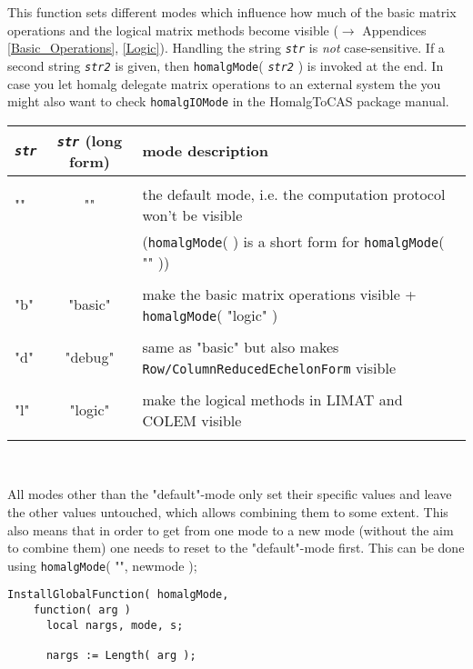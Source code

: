 \documentclass[a4paper,11pt]{report}
\begin{document}
{{{ This function sets different modes which influence how much of the basic
matrix operations and the logical matrix methods become visible ($\to$ Appendices \ref{Basic_Operations}, \ref{Logic}). Handling the string \mbox{\texttt{\mdseries\slshape str}} is \emph{not} case-sensitive. If a second string \mbox{\texttt{\mdseries\slshape str2}} is given, then \texttt{homalgMode}( \mbox{\texttt{\mdseries\slshape str2}} ) is invoked at the end. In case you let \textsf{homalg} delegate matrix operations to an external system the you might also want to
check \texttt{homalgIOMode} in the \textsf{HomalgToCAS} package manual. \begin{center}
\begin{tabular}{l|c|l}\mbox{\texttt{\mdseries\slshape str}}&
\mbox{\texttt{\mdseries\slshape str}} (long form)&
mode description\\
\hline
&
&
\\
""&
""&
the default mode, i.e. the computation protocol won't be visible\\
&
&
(\texttt{homalgMode}( ) is a short form for \texttt{homalgMode}( "" ))\\
&
&
\\
"b"&
"basic"&
make the basic matrix operations visible + \texttt{homalgMode}( "logic" )\\
&
&
\\
"d"&
"debug"&
same as "basic" but also makes \texttt{Row/ColumnReducedEchelonForm} visible\\
&
&
\\
"l"&
"logic"&
make the logical methods in \textsf{LIMAT} and \textsf{COLEM} visible\\
&
&
\\
\hline
\end{tabular}\\[2mm]
\end{center}

 All modes other than the "default"-mode only set their specific values and
leave the other values untouched, which allows combining them to some extent.
This also means that in order to get from one mode to a new mode (without the
aim to combine them) one needs to reset to the "default"-mode first. This can
be done using \texttt{homalgMode}( "", new{\textunderscore}mode ); 
\begin{Verbatim}[fontsize=\small,frame=single,label=Code]
  InstallGlobalFunction( homalgMode,
    function( arg )
      local nargs, mode, s;
      
      nargs := Length( arg );
      

\end{Verbatim}}}}
\end{document}
